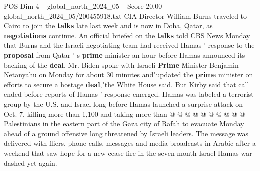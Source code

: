 \begin{textsample}{POS Dim 4 – global\_north\_2024\_05 – Score 20.00 – global\_north\_2024\_05/200455918.txt}
CIA Director William Burns traveled to Cairo to join the \textbf{talks} late last week and is now in Doha, Qatar, as \textbf{negotiations} continue.
An official briefed on the \textbf{talks} told CBS News Monday that Burns and the Israeli negotiating team had received Hamas ' response to the \textbf{proposal} from Qatar ' s \textbf{prime} minister an hour before Hamas announced its backing of the \textbf{deal}.
Mr.
Biden spoke with Israeli \textbf{Prime} Minister Benjamin Netanyahu on Monday for about 30 minutes and"updated the \textbf{prime} minister on efforts to secure a hostage \textbf{deal},"the White House said.
But Kirby said that call ended before reports of Hamas ' response emerged.
Hamas was labeled a terrorist group by the U.S. and Israel long before Hamas launched a surprise attack on Oct. 7, killing more than 1,100 and taking more than @ @ @ @ @ @ @ @ @ @ Palestinians in the eastern part of the Gaza city of Rafah to evacuate Monday ahead of a ground offensive long threatened by Israeli leaders.
The message was delivered with fliers, phone calls, messages and media broadcasts in Arabic after a weekend that saw hope for a new cease-fire in the seven-month Israel-Hamas war dashed yet again.

\end{textsample}
